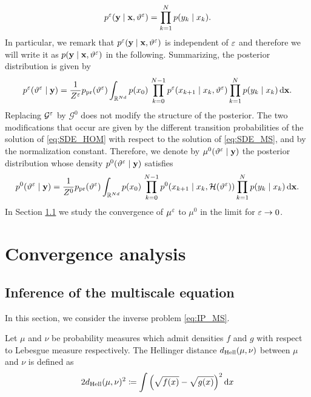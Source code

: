 \documentclass[10pt]{article}
\begin{document}
\begin{equation}
	p^\varepsilon(\mathbf y \mid \mathbf x, \vartheta^\varepsilon) = \prod_{k=1}^N p(y_k \mid x_k).
\end{equation}
In particular, we remark that $p^\varepsilon(\mathbf y \mid \mathbf x, \vartheta^\varepsilon)$ is independent of $\varepsilon$ and therefore we will write it as $p(\mathbf y \mid \mathbf x, \vartheta^\varepsilon)$ in the following. Summarizing, the posterior distribution is given by
\begin{equation}
	p^\varepsilon(\vartheta^\varepsilon \mid \mathbf y) = \frac{1}{Z^\varepsilon} p_{\mathrm{pr}}(\vartheta^\varepsilon) \int_{\mathbb{R}^{Nd}} p(x_0) \, \prod_{k=0}^{N-1} p^\varepsilon(x_{k+1} \mid x_k, \vartheta^\varepsilon)\prod_{k=1}^N p(y_k \mid x_k) \,\mathrm{d} \mathbf x.
\end{equation}
Replacing $\mathcal G^\varepsilon$ by $\mathcal G^0$ does not modify the structure of the posterior. The two modifications that occur are given by the different transition probabilities of the solution of \eqref{eq:SDE_HOM} with respect to the solution of \eqref{eq:SDE_MS}, and by the normalization constant. Therefore, we denote by $\mu^0(\vartheta^\varepsilon \mid \mathbf y)$ the posterior distribution whose density $p^0(\vartheta^\varepsilon \mid \mathbf y)$ satisfies
\begin{equation}
	p^0(\vartheta^\varepsilon \mid \mathbf y) = \frac{1}{Z^0} p_{\mathrm{pr}}(\vartheta^\varepsilon) \int_{\mathbb{R}^{Nd}} p(x_0) \, \prod_{k=0}^{N-1} p^0(x_{k+1} \mid x_k, \mathcal H(\vartheta^\varepsilon))\prod_{k=1}^N p(y_k \mid x_k) \,\mathrm{d} \mathbf x.
\end{equation}
In Section \ref{sec:ConvergenceMStoHOM} we study the convergence of $\mu^\varepsilon$ to $\mu^0$ in the limit for $\varepsilon \to 0$.  

\section{Convergence analysis}

\subsection{Inference of the multiscale equation}\label{sec:ConvergenceMStoHOM}

In this section, we consider the inverse problem \eqref{eq:IP_MS}. 

\begin{definition} Let $\mu$ and $\nu$ be probability measures which admit densities $f$ and $g$ with respect to Lebesgue measure respectively. The Hellinger distance $d_{\mathrm{Hell}}(\mu, \nu)$ between $\mu$ and $\nu$ is defined as
\begin{equation}
	2d_{\mathrm{Hell}}(\mu, \nu)^2 \coloneqq \int \Big(\sqrt{f(x)} - \sqrt{g(x)}\Big)^2 \,\mathrm{d} x
\end{equation}
\end{definition}
\end{document}
